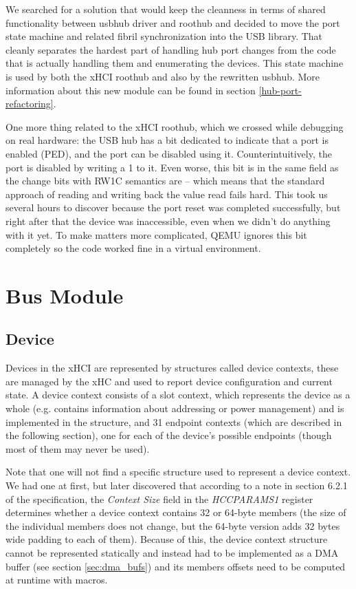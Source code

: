 We searched for a solution that would keep the cleanness in terms of shared
functionality between usbhub driver and roothub and decided to move the port
state machine and related fibril synchronization into the USB library. That
cleanly separates the hardest part of handling hub port changes from the code
that is actually handling them and enumerating the devices. This state machine
is used by both the xHCI roothub and also by the rewritten usbhub. More
information about this new module can be found in section \ref{hub-port-refactoring}.

One more thing related to the xHCI roothub, which we crossed while debugging on
real hardware: the USB hub has a bit dedicated to indicate that a port is
enabled (PED), and the port can be disabled using it. Counterintuitively, the
port is disabled by writing a 1 to it. Even worse, this bit is in the same
field as the change bits with RW1C semantics are -- which means that the
standard approach of reading and writing back the value read fails hard. This
took us several hours to discover because the port reset was completed
successfully, but right after that the device was inaccessible, even when we
didn't do anything with it yet. To make matters more complicated, QEMU ignores
this bit completely so the code worked fine in a virtual environment.

\section{Bus Module}


\subsection{Device}

Devices in the xHCI are represented by structures called device contexts, these are
managed by the xHC and used to report device configuration and current state. A device
context consists of a slot context, which represents the device as a whole (e.g. contains
information about addressing or power management) and is implemented in the 
structure, and 31 endpoint contexts (which are described in the following section), one
for each of the device's possible endpoints (though most of them may never be used).

Note that one will not find a specific structure used to represent a device context. We had
one at first, but later discovered that according to a note in section 6.2.1 of the
specification, the \textit{Context Size} field in the \textit{HCCPARAMS1} register determines whether
a device context contains 32 or 64-byte members (the size of the individual members does
not change, but the 64-byte version adds 32 bytes wide padding to each of them). Because
of this, the device context structure cannot be represented statically and instead had to be
implemented as a DMA buffer (see section \ref{sec:dma_bufs}) and its members offsets
need to be computed at runtime with macros.

